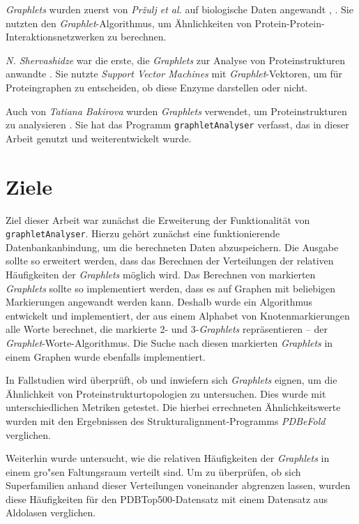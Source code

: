 \documentclass{report}
\begin{document}
\textit{Graphlets} wurden zuerst von \textit{Pr{\v z}ulj et al.} auf biologische Daten angewandt \cite{frqdistribution}, \cite{graphletfrequency}. Sie nutzten den \textit{Graphlet}-Algorithmus, um \"Ahnlichkeiten von Protein-Protein-Interaktionsnetzwerken zu berechnen.

\textit{N. Shervashidze} war die erste, die \textit{Graphlets} zur Analyse von Proteinstrukturen anwandte \cite{sherv_graphlets}. Sie nutzte \textit{Support Vector Machines} mit \textit{Graphlet}-Vektoren, um  f\"ur Proteingraphen zu entscheiden, ob diese Enzyme darstellen oder nicht.

Auch von \textit{Tatiana Bakirova} wurden \textit{Graphlets} verwendet, um Proteinstrukturen zu analysieren \cite{bakirova2013comparison}. Sie hat das Programm \texttt{graphletAnalyser} verfasst, das in dieser Arbeit genutzt und weiterentwickelt wurde.

\section{Ziele}

Ziel dieser Arbeit war zun\"achst die Erweiterung der Funktionalit\"at von \\ \texttt{graphletAnalyser}. Hierzu geh\"ort zun\"achst eine funktionierende Datenbankanbindung, um die berechneten Daten abzuspeichern. Die Ausgabe sollte so erweitert werden, dass das Berechnen der Verteilungen der relativen H\"aufigkeiten der \textit{Graphlets} m\"oglich wird.
Das Berechnen von markierten \textit{Graphlets} sollte so implementiert werden, dass es auf Graphen mit beliebigen Markierungen angewandt werden kann. Deshalb wurde ein Algorithmus entwickelt und implementiert, der aus einem Alphabet von Knotenmarkierungen alle Worte berechnet, die markierte  2- und 3-\textit{Graphlets} repr\"asentieren -- der \textit{Graphlet}-Worte-Algorithmus. Die Suche nach diesen markierten \textit{Graphlets} in einem Graphen wurde ebenfalls implementiert.


In Fallstudien wird \"uberpr\"uft, ob und inwiefern sich \textit{Graphlets} eignen, um die \"Ahnlichkeit von Proteinstrukturtopologien zu untersuchen. Dies wurde mit unterschiedlichen Metriken getestet. Die hierbei errechneten \"Ahnlichkeitswerte wurden mit den Ergebnissen des Strukturalignment-Programms \textit{PDBeFold} \cite{pdbefold} verglichen.


Weiterhin wurde untersucht, wie die relativen H\"aufigkeiten der \textit{Graphlets} in einem gro"sen Faltungsraum verteilt sind. Um zu \"uberpr\"ufen, ob sich Superfamilien anhand dieser Verteilungen voneinander abgrenzen lassen, wurden diese H\"aufigkeiten f\"ur den PDBTop500-Datensatz mit einem Datensatz aus Aldolasen verglichen.
\end{document}
